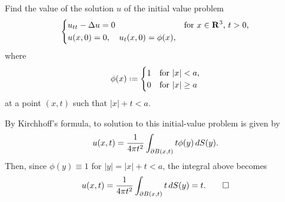 \begin{problem}
  Find the value of the solution \(u\) of the initial value problem
  \[
    \left\{
      \begin{aligned}
        &u_{tt}-\Lap u=0&&\text{for \(x\in\R^3\), \(t>0\),}\\
        &u(x,0)=0,\quad u_t(x,0)=\phi(x),
      \end{aligned}
    \right.
  \]
  where
  \[
    \phi(x)\defeq
    \begin{cases}
      1&\text{for \(|x|<a\),}\\
      0&\text{for \(|x|\geq a\)}
    \end{cases}
  \]
  at a point \((x,t)\) such that \(|x|+t<a\).
\end{problem}
\begin{solution*}
  By Kirchhoff's formula, to solution to this initial-value problem is
  given by
  \[
    u(x,t)=\frac{1}{4\pi t^2}\int_{\partial B(x,t)} t\phi(y)\diff S(y).
  \]
  Then, since \(\phi(y)\equiv 1\) for \(|y|=|x|+t<a\), the integral above
  becomes
  \[
    u(x,t)=\frac{1}{4\pi t^2}\int_{\partial B(x,t)} t\mathop{}\!d S(y)=t.\qedhere
  \]
\end{solution*}


